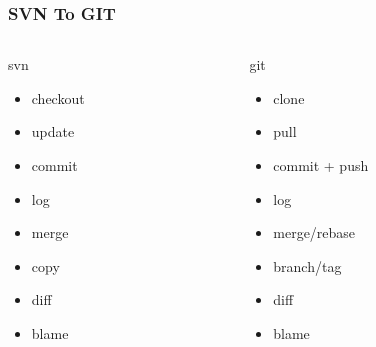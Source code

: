 \begin{frame}
	\frametitle{SVN To GIT}
	\begin{columns}
		\begin{column}{0.49\textwidth}
			\begin{block}{svn}
				\begin{itemize}
					\item checkout
					\item update
					\item commit
					\item log
					\item merge
					\item copy
					\item diff
					\item blame
				\end{itemize}
			\end{block}
		\end{column}
		\begin{column}{0.49\textwidth}
			\begin{block}{git}
				\begin{itemize}
					\item clone
					\item pull
					\item commit + push
					\item log
					\item merge/rebase
					\item branch/tag
					\item diff
					\item blame
				\end{itemize}
			\end{block}
		\end{column}
	\end{columns}
\end{frame}

